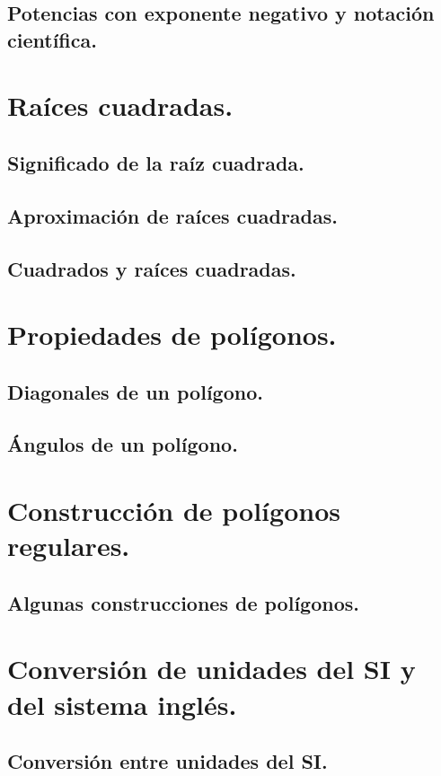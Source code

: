\documentclass[11pt]{book}
\begin{document}
\subsection{Potencias con exponente negativo y notación científica.}

\section{Raíces cuadradas.}
\subsection{Significado de la raíz cuadrada.}
\subsection{Aproximación de raíces cuadradas.}
\subsection{Cuadrados y raíces cuadradas.}

\section{Propiedades de polígonos.}
\subsection{Diagonales de un polígono.}
\subsection{Ángulos de un polígono.}

\section{Construcción de polígonos regulares.}
\subsection{Algunas construcciones de polígonos.}

\section{Conversión de unidades del SI y del sistema inglés.}
\subsection{Conversión entre unidades del SI.}
\end{document}
